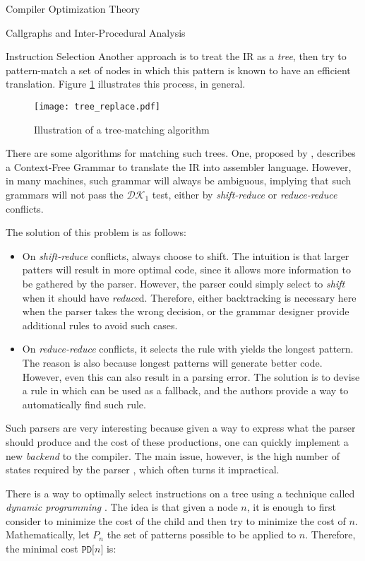 \begin{section}{Compiler Optimization Theory}
\begin{section}{Callgraphs and Inter-Procedural Analysis}
\begin{subsection}{Instruction Selection}
	Another approach is to treat the IR as a \textit{tree}, then try to pattern-match
	a set of nodes in which this pattern is known to have an efficient translation.
	Figure \ref{fig:tree-matching} illustrates this process, in general.

\begin{figure}
\centering
	 \texttt{[image: tree\_replace.pdf]}
	  \caption{Illustration of a tree-matching algorithm}
	  \label{fig:tree-matching}
\end{figure}

	There are some algorithms for matching such trees. One, proposed by
	\cite{glanville1978}, describes a Context-Free Grammar to translate
	the IR into assembler language. However, in many machines, such grammar
	will always be ambiguous, implying that such grammars will not pass
	the $\mathcal{DK}_1$ test, either by \textit{shift-reduce} or
	\textit{reduce-reduce} conflicts.

	The solution of this problem is as follows:

	\begin{itemize}
		\item On \textit{shift-reduce} conflicts,
	always choose to shift. The intuition is that larger patters will result in
	more optimal code, since it allows more information to be gathered by the parser.
	However, the parser could simply select to \textit{shift} when it should have
	\textit{reduce}d. Therefore, either backtracking is necessary here when the parser
	takes the wrong decision, or the grammar designer provide additional rules to avoid
	such cases.
	
		\item On \textit{reduce-reduce} conflicts, it selects the rule with yields
		the longest pattern. The reason is also because longest patterns will generate
		better code. However, even this can also result in a parsing error. The
		solution is to devise a rule in which can be used as a fallback, and the
		authors provide a way to automatically find such rule.
	\end{itemize}

	Such parsers are very interesting because given a way to express what the parser
	should produce and the cost of these productions, one can quickly implement
	a new \textit{backend} to the compiler.
	The main issue, however, is the high number of states required by the
	parser \citep{blindell2016instruction}, which often turns it impractical.

	There is a way to optimally select instructions on a tree using a technique
	called \textit{dynamic programming} \citep{ripken1977formale}. The idea is
	that given a node $n$, it is enough to first consider to minimize the cost
	of the child and then try to minimize the cost of $n$. Mathematically, let
	$P_n$ the set of patterns possible to be applied to $n$. Therefore, the
	minimal cost $\texttt{PD[}n\texttt{]}$ is:


\end{subsection}
\end{section}
\end{section}
